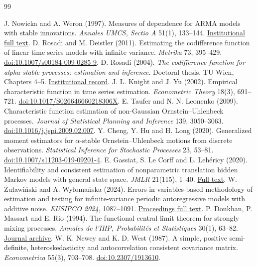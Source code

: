 \documentclass[11pt,a4paper]{article}
\theoremstyle{remark}\newtheorem{remark}[theorem]{Remark}
\begin{document}
\begin{thebibliography}{99}\small\raggedright\setlength{\itemsep}{1pt}\setlength{\parskip}{0pt}
 J. Nowicka and A. Weron (1997). Measures of dependence for ARMA models with stable innovations. \emph{Annales UMCS, Sectio A} 51(1), 133--144. \href{https://bc.umcs.pl/Content/30455/PDF/czas4050_51_1_1997_14.pdf}{Institutional full text}.
 D. Rosadi and M. Deistler (2011). Estimating the codifference function of linear time series models with infinite variance. \emph{Metrika} 73, 395--429. \href{https://doi.org/10.1007/s00184-009-0285-9}{doi:10.1007/s00184-009-0285-9}.
 D. Rosadi (2004). \emph{The codifference function for alpha-stable processes: estimation and inference}. Doctoral thesis, TU Wien, Chapters 4--5. \href{https://repositum.tuwien.at/handle/20.500.12708/14337}{Institutional record}.
 J. L. Knight and J. Yu (2002). Empirical characteristic function in time series estimation. \emph{Econometric Theory} 18(3), 691--721. \href{https://doi.org/10.1017/S026646660218306X}{doi:10.1017/S026646660218306X}.
 E. Taufer and N. N. Leonenko (2009). Characteristic function estimation of non-Gaussian Ornstein--Uhlenbeck processes. \emph{Journal of Statistical Planning and Inference} 139, 3050--3063. \href{https://doi.org/10.1016/j.jspi.2009.02.007}{doi:10.1016/j.jspi.2009.02.007}.
 Y. Cheng, Y. Hu and H. Long (2020). Generalized moment estimators for $\alpha$-stable Ornstein--Uhlenbeck motions from discrete observations. \emph{Statistical Inference for Stochastic Processes} 23, 53--81. \href{https://doi.org/10.1007/s11203-019-09201-4}{doi:10.1007/s11203-019-09201-4}.
 E. Gassiat, S. Le Corff and L. Leh\'ericy (2020). Identifiability and consistent estimation of nonparametric translation hidden Markov models with general state space. \emph{JMLR} 21(115), 1--40. \href{https://www.jmlr.org/papers/volume21/19-802/19-802.pdf}{Full text}.
 W. \.Zu{\l}awi\'nski and A. Wy{\l}oma\'nska (2024). Errors-in-variables-based methodology of estimation and testing for infinite-variance periodic autoregressive models with additive noise. \emph{EUSIPCO 2024}, 1087--1091. \href{https://eurasip.org/Proceedings/Eusipco/Eusipco2024/pdfs/0001087.pdf}{Proceedings full text}.
 P. Doukhan, P. Massart and E. Rio (1994). The functional central limit theorem for strongly mixing processes. \emph{Annales de l'IHP, Probabilit\'es et Statistiques} 30(1), 63--82. \href{https://www.numdam.org/item/AIHPB_1994__30_1_63_0/}{Journal archive}.
 W. K. Newey and K. D. West (1987). A simple, positive semi-definite, heteroskedasticity and autocorrelation consistent covariance matrix. \emph{Econometrica} 55(3), 703--708. \href{https://doi.org/10.2307/1913610}{doi:10.2307/1913610}.


\end{thebibliography}
\end{document}

